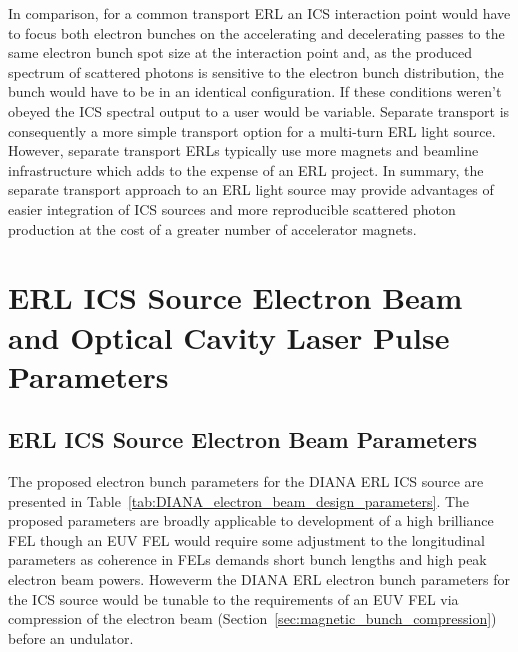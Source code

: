 \documentclass[../main.tex]{subfiles}
\begin{document}
In comparison, for a common transport ERL an ICS interaction point would have to focus both electron bunches on the accelerating and decelerating passes to the same electron bunch spot size at the interaction point and, as the produced spectrum of scattered photons is sensitive to the electron bunch distribution, the bunch would have to be in an identical configuration. If these conditions weren't obeyed the ICS spectral output to a user would be variable. Separate transport is consequently a more simple transport option for a multi-turn ERL light source. However, separate transport ERLs typically use more magnets and beamline infrastructure which adds to the expense of an ERL project. In summary, the separate transport approach to an ERL light source may provide advantages of easier integration of ICS sources and more reproducible scattered photon production at the cost of a greater number of accelerator magnets.  

\section{ERL ICS Source Electron Beam and Optical Cavity Laser Pulse Parameters}

\subsection{ERL ICS Source Electron Beam Parameters }
\label{sec:DIANA_electron_parameters}

The proposed electron bunch parameters for the DIANA ERL ICS source are presented in Table~\ref{tab:DIANA_electron_beam_design_parameters}. The proposed parameters are broadly applicable to development of a high brilliance FEL though an EUV FEL would require some adjustment to the longitudinal parameters as coherence in FELs demands short bunch lengths and high peak electron beam powers. Howeverm the DIANA ERL electron bunch parameters for the ICS source would be tunable to the requirements of an EUV FEL via compression of the electron beam (Section~\ref{sec:magnetic_bunch_compression}) before an undulator. 
\end{document}

